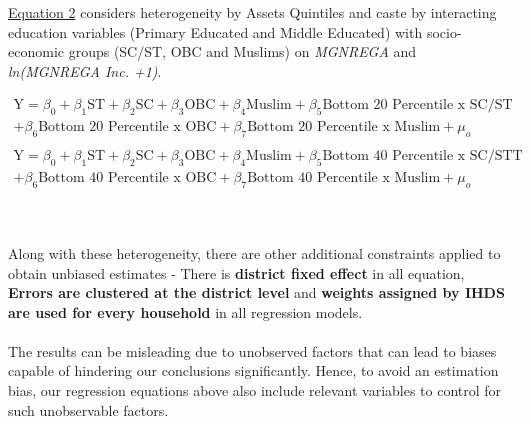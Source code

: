 \documentclass{article}
\begin{document}
\hyperref[eq2]{Equation 2} considers heterogeneity by Assets Quintiles and caste by interacting education variables (Primary Educated and Middle Educated) with socio-economic groups (SC/ST, OBC and Muslims) on \emph{MGNREGA} and \emph{ln(MGNREGA Inc. +1)}.

\begin{equation}
\begin{aligned}
\text{Y} = \beta_{0} + \beta_{1}\text{ST}+\beta_{2}\text{SC}+ \beta_{3}\text{OBC} + \beta_{4}\text{Muslim} + \beta_{5}\text{Bottom 20 Percentile x SC/ST}\\ + \beta_{6}\text{Bottom 20 Percentile x OBC} + \beta_{7}\text{Bottom 20 Percentile x Muslim}  +\mu_{o}
\\\\
\text{Y} = \beta_{0} + \beta_{1}\text{ST}+\beta_{2}\text{SC}+ \beta_{3}\text{OBC} + \beta_{4}\text{Muslim}+ \beta_{5}\text{Bottom 40 Percentile x SC/STT}\\+ \beta_{6}\text{Bottom 40 Percentile x OBC}+ \beta_{7}\text{Bottom 40 Percentile x Muslim}  +\mu_{o}
\end{aligned}
\label{eq2}
\end{equation}


\\
\\

Along with these heterogeneity, there are other additional constraints applied to obtain unbiased estimates - There is \textbf{district fixed effect} in all equation, \textbf{Errors are clustered at the district level} and \textbf{weights assigned by IHDS are used for every household} in all regression models.
\\
\\
The results can be misleading due to unobserved factors that can lead to biases capable of hindering our conclusions significantly.  Hence, to avoid an estimation bias,  our regression equations above also include relevant variables to control for such unobservable factors.
\end{document}
